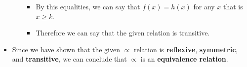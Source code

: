 \documentclass[12pt]{article}
\begin{document}
\begin{itemize}
\begin{enumerate}
\begin{itemize}
            \item By this equalities, we can say that $f(x)=h(x)$ for any $x$ that is $x \geq k$.
            \item Therefore we can say that the given relation is transitive.
        \end{itemize}
    \end{enumerate}
    \item Since we have shown that the given $\propto$ relation is \textbf{reflexive}, \textbf{symmetric}, and \textbf{transitive}, we can conclude that $\propto$ is an \textbf{equivalence relation}.
\end{itemize}
\end{document}
